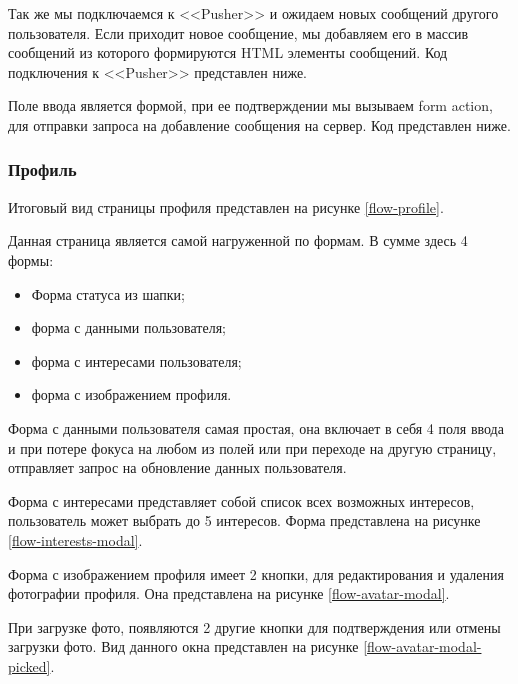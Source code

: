 Так же мы подключаемся к <<Pusher>> и ожидаем новых сообщений другого пользователя. Если приходит новое сообщение, мы добавляем его в массив сообщений из которого формируются HTML элементы сообщений. Код подключения к <<Pusher>> представлен ниже.


Поле ввода является формой, при ее подтверждении мы вызываем form action, для отправки запроса на добавление сообщения на сервер. Код представлен ниже.


\subsubsection{Профиль}

Итоговый вид страницы профиля представлен на рисунке \ref{flow-profile}.


Данная страница является самой нагруженной по формам. В сумме здесь 4 формы:
\begin{itemize}
    \item Форма статуса из шапки;
    \item форма с данными пользователя;
    \item форма с интересами пользователя;
    \item форма с изображением профиля.
\end{itemize}

Форма с данными пользователя самая простая, она включает в себя 4 поля ввода и при потере фокуса на любом из полей или при переходе на другую страницу, отправляет запрос на обновление данных пользователя.

Форма с интересами представляет собой список всех возможных интересов, пользователь может выбрать до 5 интересов. Форма представлена на рисунке \ref{flow-interests-modal}.


Форма с изображением профиля имеет 2 кнопки, для редактирования и удаления фотографии профиля. Она представлена на рисунке \ref{flow-avatar-modal}.


При загрузке фото, появляются 2 другие кнопки для подтверждения или отмены загрузки фото. Вид данного окна представлен на рисунке \ref{flow-avatar-modal-picked}.


